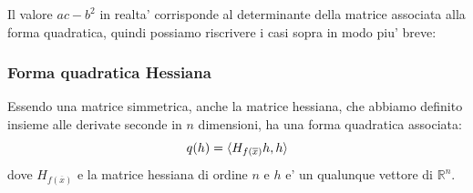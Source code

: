 \documentclass{report}
\begin{document}
Il valore $ ac-b^2 $ in realta' corrisponde al determinante della matrice associata alla forma quadratica, quindi possiamo riscrivere i casi sopra in modo piu' breve:

\subsubsection{Forma quadratica Hessiana}
Essendo una matrice simmetrica, anche la matrice hessiana, che abbiamo definito insieme alle derivate seconde in $ n $ dimensioni, ha una forma quadratica associata:
\[
  q(h) = \langle H_{f(\overline{x})}h, h \rangle
\]
dove $ H_{f(\overline{x})} $ e la matrice hessiana di ordine $ n $ e $ h $ e' un qualunque vettore di $ \mathbb{R}^n $.
\end{document}
